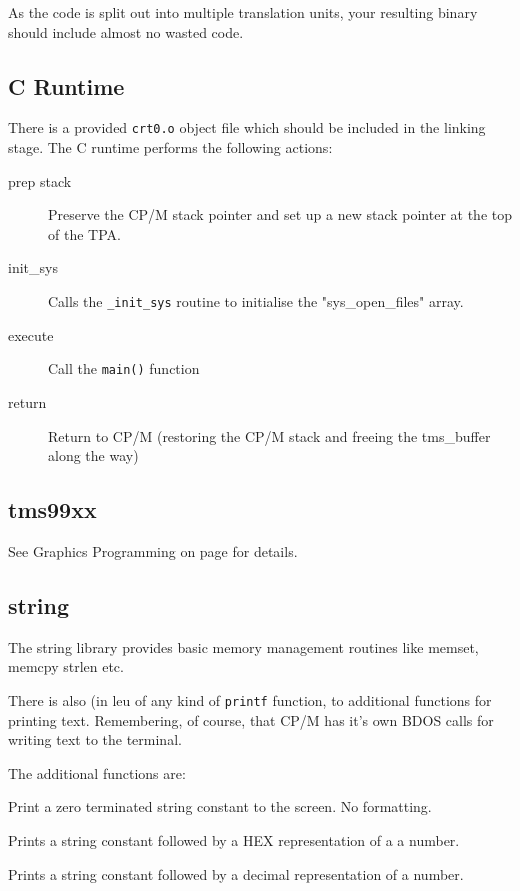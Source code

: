 \documentclass[10pt,a4paper,hidelinks]{article}
\begin{document}
As the code is split out into multiple translation units, your resulting binary
should include almost no wasted code.


\subsection{C Runtime}

There is a provided \texttt{crt0.o} object file which should be included in the
linking stage.  The C runtime performs the following actions:

\begin{description}
  \item[prep stack] Preserve the CP/M stack pointer and set up a new stack
    pointer at the top of the TPA.
  \item[init\_sys] Calls the \texttt{\_init\_sys} routine to initialise the
    "sys\_open\_files" array.
  \item[execute] Call the \texttt{main()} function
  \item[return] Return to CP/M (restoring the CP/M stack and freeing the
    tms\_buffer along the way)
\end{description}

\subsection{tms99xx}

See Graphics Programming on page \pageref{graphicsprogramming} for details.

\subsection{string}

The string library provides basic memory management routines like memset, memcpy
strlen etc.

There is also (in leu of any kind of \texttt{printf} function, to additional
functions for printing text.  Remembering, of course, that CP/M has it's own
BDOS calls for writing text to the terminal.

The additional functions are:

\begin{description}[font=$\bullet$~\normalfont\scshape\color{red!50!black}]
  \item[puts] Print a zero terminated string constant to the screen.  No
    formatting.
  \item[print\_kvh] Prints a string constant followed by a HEX representation of
    a a number.
  \item[print\_kvd] Prints a string constant followed by a decimal
    representation of a number.
\end{description}
\end{document}
